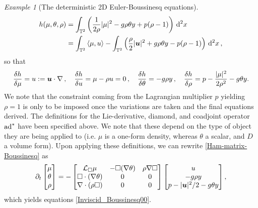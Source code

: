 \documentclass[11pt, oneside]{article}   	%
\numberwithin{equation}{section}
\theoremstyle{plain}
\theoremstyle{definition}
\theoremstyle{remark}
\newtheorem{example}{Example}
\newcommand{\<}{\langle}
\renewcommand{\>}{\rangle}
\def\rmd{{\mathrm{d}}}
\newcommand{\mb}[1]{\mbox{\boldmath{$#1$}}}
\begin{document}
\begin{example}[The deterministic 2D Euler-Boussinesq equations]
\begin{align}
\begin{split}
h(\mu,\theta,\rho) &=  \int_{\mathbb{T}^2} \left(\frac{1}{2\rho} |\mu|^2  
-  g\rho  \theta y + p (\rho-1) \right) \,{\rmd} ^2x 
\\&= \int_{\mathbb{T}^2} \left \langle \mu, u \right \rangle 
- \int_{\mathbb{T}^2} \left(\frac{\rho}{2} |\mb{u}|^2 + g\rho \theta y - p (\rho-1) \right) \,{\rmd} ^2x
\,,
\end{split}
\label{Boussinesq-Ham}
\end{align}
so that
\begin{align}
\frac{\delta h}{\delta \mu} = u := \mb u\cdot\nabla
\,,\quad
\frac{\delta h}{ \delta u} = \mu - \rho u = 0
\,,\quad
\frac{\delta h}{ \delta \theta} = -g\rho y
\,,\quad
\frac{\delta h}{\delta \rho} = p - \frac{|\mu|^2}{2\rho^2}- g\theta y.
\label{EBHam-var}
\end{align}
We note that the constraint coming from the Lagrangian multiplier $p$ yielding $\rho = 1$ is only to be imposed once the variations are taken and the final equations derived.
The definitions for the Lie-derivative, diamond, and coadjoint operator ${\rm ad}^*$ have been specified above. We note that these depend on the type of object they are being applied to (i.e. $\mu$ is a one-form density, whereas $\theta$ a scalar, and $D$ a volume form). Upon applying these definitions, we can rewrite \eqref{Ham-matrix-Boussinesq} as 
\begin{align}
\partial_t
\begin{bmatrix}
\mu \\  \theta \\ \rho 
\end{bmatrix}
= -
\begin{bmatrix}
 \mathcal{L}_{\Box} \mu &  - \Box  (\nabla \theta)    &  \rho \nabla {\Box}
\\ 
\Box \cdot (\nabla \theta) & 0 & 0 \\
 \nabla \cdot  (\rho \Box) & 0 & 0
\end{bmatrix}
\begin{bmatrix}
 u
\\  -g\rho y \\ p - |\mb{u}|^2/2 - g\theta y
\end{bmatrix},
\label{Ham-matrix-Boussinesq2}
\end{align}
which yields equations \eqref{Inviscid_Boussinesq00}. 
\end{example}
\end{document}
